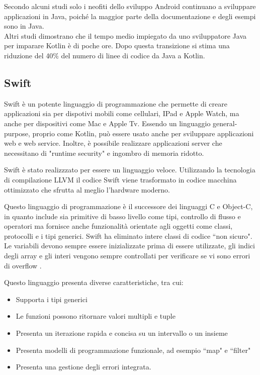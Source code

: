 Secondo alcuni studi solo i neofiti dello sviluppo Android continuano a sviluppare applicazioni in Java, poich\'e la maggior parte
della documentazione e degli esempi sono in Java.\\
Altri studi dimostrano che il tempo medio impiegato da uno sviluppatore Java per imparare Kotlin \`e di poche ore. Dopo questa transizione si stima una riduzione del 40\% del numero di linee di codice da Java a Kotlin\cite{KotlinInfoWorld}.\\
\subsection{Swift}
Swift \`e un potente linguaggio di programmazione che permette di creare applicazioni sia per dispotivi mobili come cellulari,
IPad e Apple Watch, ma anche per dispositivi come Mac e Apple Tv.
Essendo un linguaggio general-purpose, proprio come Kotlin, pu\`o essere usato anche per sviluppare applicazioni web e web service. Inoltre, \`e possibile realizzare applicazioni server che
necessitano di "runtime security" e ingombro di memoria ridotto.

Swift \`e stato realizzzato per essere un linguaggio veloce. Utilizzando la tecnologia di compilazione LLVM il codice Swift viene trasformato in codice macchina ottimizzato che sfrutta al meglio
l'hardware moderno.

Questo linguaggio di programmazione \`e il successore dei linguaggi C e Object-C, in quanto include sia primitive di basso livello come tipi,
controllo di flusso e operatori ma fornisce anche funzionalit\`a orientate agli oggetti come classi, protocolli e i tipi generici.
Swift ha eliminato intere classi di codice ``non sicuro". Le variabili devono sempre essere inizializzate prima di essere utilizzate, gli indici degli array e gli interi
vengono sempre controllati per verificare se vi sono errori di overflow \cite{Apple:Com}.

Questo linguaggio presenta diverse caratteristiche, tra cui\cite{Apple:Swift}:
\begin{itemize}
      \item Supporta i tipi generici
      \item Le funzioni possono ritornare valori multipli e tuple
      \item Presenta un iterazione rapida e concisa su un intervallo o un insieme
      \item Presenta modelli di programmazione funzionale, ad esempio ``map" e ``filter"
      \item Presenta una gestione degli errori integrata.
\end{itemize}

